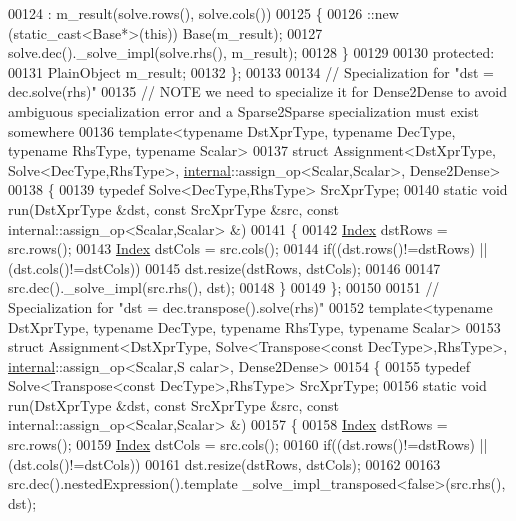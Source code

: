 \begin{DoxyCode}
00124     : m\_result(solve.rows(), solve.cols())
00125   \{
00126     ::new (static\_cast<Base*>(\textcolor{keyword}{this})) Base(m\_result);
00127     solve.dec().\_solve\_impl(solve.rhs(), m\_result);
00128   \}
00129   
00130 protected:  
00131   PlainObject m\_result;
00132 \};
00133 
00134 \textcolor{comment}{// Specialization for "dst = dec.solve(rhs)"}
00135 \textcolor{comment}{// NOTE we need to specialize it for Dense2Dense to avoid ambiguous specialization error and a
       Sparse2Sparse specialization must exist somewhere}
00136 template<typename DstXprType, typename DecType, typename RhsType, typename Scalar>
00137 struct Assignment<DstXprType, Solve<DecType,RhsType>, \hyperlink{namespaceinternal}{internal}::assign\_op<Scalar,Scalar>, 
      Dense2Dense>
00138 \{
00139   \textcolor{keyword}{typedef} Solve<DecType,RhsType> SrcXprType;
00140   \textcolor{keyword}{static} \textcolor{keywordtype}{void} run(DstXprType &dst, \textcolor{keyword}{const} SrcXprType &src, \textcolor{keyword}{const} internal::assign\_op<Scalar,Scalar> &)
00141   \{
00142     \hyperlink{namespace_eigen_a62e77e0933482dafde8fe197d9a2cfde}{Index} dstRows = src.rows();
00143     \hyperlink{namespace_eigen_a62e77e0933482dafde8fe197d9a2cfde}{Index} dstCols = src.cols();
00144     \textcolor{keywordflow}{if}((dst.rows()!=dstRows) || (dst.cols()!=dstCols))
00145       dst.resize(dstRows, dstCols);
00146 
00147     src.dec().\_solve\_impl(src.rhs(), dst);
00148   \}
00149 \};
00150 
00151 \textcolor{comment}{// Specialization for "dst = dec.transpose().solve(rhs)"}
00152 \textcolor{keyword}{template}<\textcolor{keyword}{typename} DstXprType, \textcolor{keyword}{typename} DecType, \textcolor{keyword}{typename} RhsType, \textcolor{keyword}{typename} Scalar>
00153 \textcolor{keyword}{struct }Assignment<DstXprType, Solve<Transpose<const DecType>,RhsType>, \hyperlink{namespaceinternal}{internal}::assign\_op<Scalar,S
      calar>, Dense2Dense>
00154 \{
00155   \textcolor{keyword}{typedef} Solve<Transpose<const DecType>,RhsType> SrcXprType;
00156   \textcolor{keyword}{static} \textcolor{keywordtype}{void} run(DstXprType &dst, \textcolor{keyword}{const} SrcXprType &src, \textcolor{keyword}{const} internal::assign\_op<Scalar,Scalar> &)
00157   \{
00158     \hyperlink{namespace_eigen_a62e77e0933482dafde8fe197d9a2cfde}{Index} dstRows = src.rows();
00159     \hyperlink{namespace_eigen_a62e77e0933482dafde8fe197d9a2cfde}{Index} dstCols = src.cols();
00160     \textcolor{keywordflow}{if}((dst.rows()!=dstRows) || (dst.cols()!=dstCols))
00161       dst.resize(dstRows, dstCols);
00162 
00163     src.dec().nestedExpression().template \_solve\_impl\_transposed<false>(src.rhs(), dst);

\end{DoxyCode}
